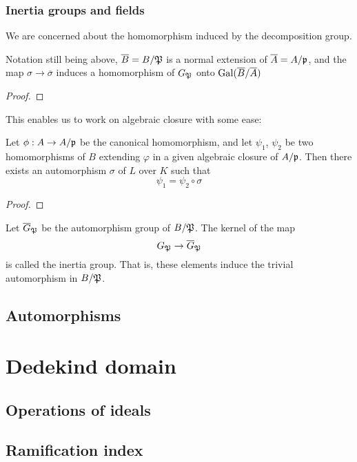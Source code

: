 			
			\subsubsection{Inertia groups and fields}
				We are concerned about the homomorphism induced by the decomposition group.
				\begin{theorem}
					Notation still being above, $\overline{B}=B/\mathfrak{P}$ is a normal extension of $\overline{A}=A/\mathfrak{p}$, and the map $\sigma \to \overline{\sigma}$ induces a homomorphism of $G_\mathfrak{P}$ onto $\operatorname{Gal}(\overline{B}/\overline{A})$
				\end{theorem}
				\begin{proof}
				\end{proof}
				This enables us to work on algebraic closure with some ease:
				\begin{corollary}
					Let $\phi:A \to A/\mathfrak{p}$ be the canonical homomorphism, and let $\psi_1$, $\psi_2$ be two homomorphisms of $B$ extending $\varphi$ in a given algebraic closure of $A/\mathfrak{p}$. Then there exists an automorphism $\sigma$ of $L$ over $K$ such that
					\[
						\psi_1 = \psi_2 \circ \sigma
					\]
				\end{corollary}
				\begin{proof}
				\end{proof}
			
				\begin{definition}
					Let $\overline{G}_\mathfrak{P}$ be the automorphism group of $B/\mathfrak{P}$. The kernel of the map
					\[
						G_\mathfrak{P} \to \overline{G}_\mathfrak{P}
					\]
					is called the inertia group. That is, these elements induce the trivial automorphism in $B/\mathfrak{P}$.
				\end{definition}
		\subsection{Automorphisms}
	\section{Dedekind domain}
	
		\subsection{Operations of ideals}
		\subsection{Ramification index}
		
